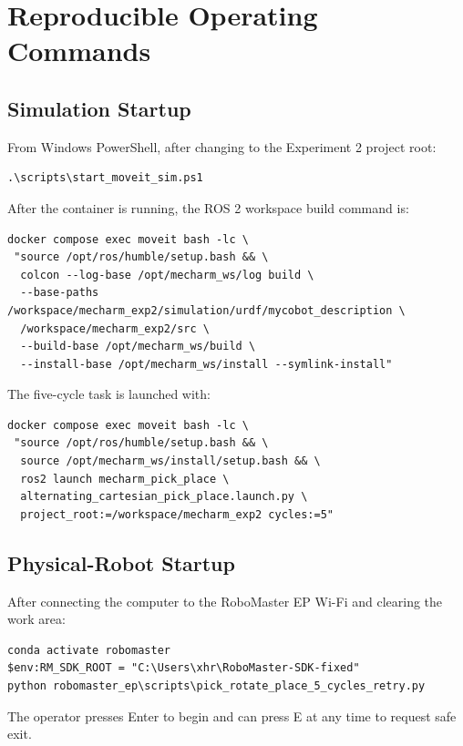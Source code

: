 \documentclass[UTF8,zihao=-4,scheme=chinese,fontset=none]{ctexart}
\begin{document}
\section{Reproducible Operating Commands}

\subsection{Simulation Startup}

From Windows PowerShell, after changing to the Experiment 2 project root:
\begin{lstlisting}[caption={Start Docker runtime and Isaac Sim}]
.\scripts\start_moveit_sim.ps1
\end{lstlisting}
After the container is running, the ROS 2 workspace build command is:
\begin{lstlisting}[caption={Build the ROS 2 packages inside Docker}]
docker compose exec moveit bash -lc \
 "source /opt/ros/humble/setup.bash && \
  colcon --log-base /opt/mecharm_ws/log build \
  --base-paths /workspace/mecharm_exp2/simulation/urdf/mycobot_description \
  /workspace/mecharm_exp2/src \
  --build-base /opt/mecharm_ws/build \
  --install-base /opt/mecharm_ws/install --symlink-install"
\end{lstlisting}

The five-cycle task is launched with:
\begin{lstlisting}[caption={Execute five alternating simulation cycles}]
docker compose exec moveit bash -lc \
 "source /opt/ros/humble/setup.bash && \
  source /opt/mecharm_ws/install/setup.bash && \
  ros2 launch mecharm_pick_place \
  alternating_cartesian_pick_place.launch.py \
  project_root:=/workspace/mecharm_exp2 cycles:=5"
\end{lstlisting}

\subsection{Physical-Robot Startup}

After connecting the computer to the RoboMaster EP Wi-Fi and clearing the work area:
\begin{lstlisting}[caption={Run the physical five-cycle retry program}]
conda activate robomaster
$env:RM_SDK_ROOT = "C:\Users\xhr\RoboMaster-SDK-fixed"
python robomaster_ep\scripts\pick_rotate_place_5_cycles_retry.py
\end{lstlisting}
The operator presses Enter to begin and can press E at any time to request safe exit.
\end{document}
